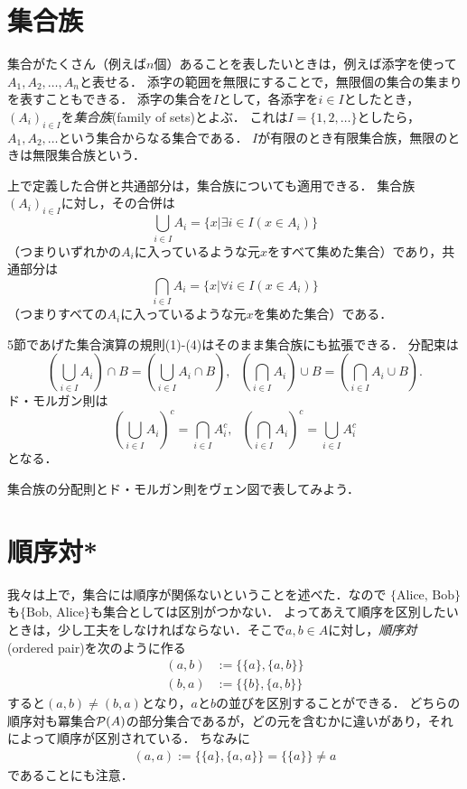\documentclass[11pt,a4paper]{jsarticle}
\begin{document}
\section{集合族}
集合がたくさん（例えば$n$個）あることを表したいときは，例えば添字を使って$A_1, A_2, \dots, A_n$と表せる．
添字の範囲を無限にすることで，無限個の集合の集まりを表すこともできる．
添字の集合を$I$として，各添字を$i \in I$としたとき，$(A_i)_{i\in I}$を\emph{集合族}(family of sets)とよぶ．
これは$I = \{1, 2,  \dots\}$としたら，$A_1, A_2, \dots$という集合からなる集合である．
$I$が有限のとき有限集合族，無限のときは無限集合族という．

上で定義した合併と共通部分は，集合族についても適用できる．
集合族$(A_i)_{i\in I}$に対し，その合併は
\[
 \bigcup_{i \in I} A_i = \{ x | \exists i \in I (x \in A_i) \}
\]
（つまりいずれかの$A_i$に入っているような元$x$をすべて集めた集合）であり，共通部分は
\[
 \bigcap_{i \in I} A_i = \{ x | \forall i \in I (x \in A_i) \}
\]
（つまりすべての$A_i$に入っているような元$x$を集めた集合）である．

5節であげた集合演算の規則(1)-(4)はそのまま集合族にも拡張できる．
分配束は
\[
 \left( \bigcup_{i \in I} A_i \right) \cap B = \left( \bigcup_{i \in I} A_i  \cap B \right) , \ \ \ 
 \left( \bigcap_{i \in I} A_i \right) \cup B = \left( \bigcap_{i \in I} A_i  \cup B \right). 
\]
ド・モルガン則は
\[
 \left( \bigcup_{i \in I} A_i \right)^c = \bigcap_{i \in I} A_i^c, \ \ \ 
 \left( \bigcap_{i \in I} A_i \right)^c = \bigcup_{i \in I} A_i^c
\]
となる．

\begin{exercise}
集合族の分配則とド・モルガン則をヴェン図で表してみよう．
\end{exercise} 




\section{順序対*}
我々は上で，集合には順序が関係ないということを述べた．なので $\{\text{Alice, Bob}\}$も$\{\text{Bob, Alice}\}$も集合としては区別がつかない．
よってあえて順序を区別したいときは，少し工夫をしなければならない．そこで$a, b \in A$に対し，\emph{順序対}(ordered pair)を次のように作る
\begin{align*}
 (a, b) &:= \{ \{a\}, \{a, b\} \} \\
 (b, a) &:= \{ \{b\}, \{a, b\} \} 
\end{align*}
すると$(a,b) \neq (b,a)$となり，$a$と$b$の並びを区別することができる．
どちらの順序対も冪集合$\mathcal{P}(A)$の部分集合であるが，どの元を含むかに違いがあり，それによって順序が区別されている．
ちなみに
\begin{align*}
 (a, a) := \{ \{a\}, \{a, a\} \} = \{ \{a\} \} \neq a 
\end{align*}
であることにも注意．
\end{document}
